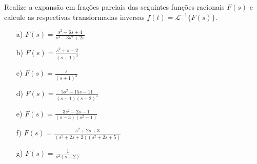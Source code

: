 \begin{Exercise}{\label{frac_parciais}} Realize a expansão em frações parciais das seguintes funções racionais $F(s)$ e calcule as respectivas transformadas inversas $f(t)=\mathcal{L}^{-1}\{F(s)\}$.
\begin{itemize}
\item[a)]$F(s)=\frac{s^2-6s+4}{s^3-3s^2+2s}$
\item[b)]$F(s)=\frac{s^2+s-2}{(s+1)^3}$
\item[c)]$F(s)=\frac{s}{(s+1)^3}$
\item[d)]$F(s)=\frac{5s^2-15s-11}{(s+1)(s-2)^3}$
\item[e)]$F(s)=\frac{3s^2-2s-1}{(s-3)(s^2+1)}$
\item[f)]$F(s)=\frac{s^2+2s+3}{(s^2+2s+2)(s^2+2s+5)}$
\item[g)]$F(s)=\frac{1}{s^2(s-2)}$
\end{itemize}
\end{Exercise}
